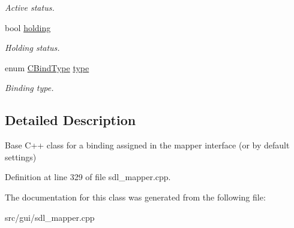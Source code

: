 \begin{DoxyCompactItemize}
\begin{DoxyCompactList}\small\item\em Active status. \end{DoxyCompactList}\item 
\hypertarget{classCBind_a4a0d6d7650d3a24cc0bc68c985d26ade}{bool \hyperlink{classCBind_a4a0d6d7650d3a24cc0bc68c985d26ade}{holding}}\label{classCBind_a4a0d6d7650d3a24cc0bc68c985d26ade}

\begin{DoxyCompactList}\small\item\em Holding status. \end{DoxyCompactList}\item 
\hypertarget{classCBind_a9e5121ab697c2c56cb20a20bd151ac45}{enum \hyperlink{classCBind_a6bd04329a3b3b8673f7bd4469f92eb61}{C\-Bind\-Type} \hyperlink{classCBind_a9e5121ab697c2c56cb20a20bd151ac45}{type}}\label{classCBind_a9e5121ab697c2c56cb20a20bd151ac45}

\begin{DoxyCompactList}\small\item\em Binding type. \end{DoxyCompactList}\end{DoxyCompactItemize}


\subsection{Detailed Description}
Base C++ class for a binding assigned in the mapper interface (or by default settings) 

Definition at line 329 of file sdl\-\_\-mapper.\-cpp.



The documentation for this class was generated from the following file\-:\begin{DoxyCompactItemize}
\item 
src/gui/sdl\-\_\-mapper.\-cpp\end{DoxyCompactItemize}
